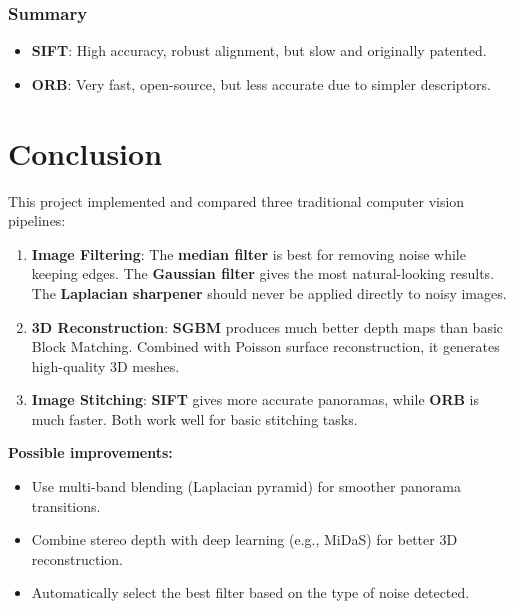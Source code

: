 \documentclass[a4paper,12pt]{article}
\begin{document}
\subsubsection*{Summary}

\begin{itemize}
    \item \textbf{SIFT}: High accuracy, robust alignment, but slow and originally patented.
    \item \textbf{ORB}: Very fast, open-source, but less accurate due to simpler descriptors.
\end{itemize}

\section{Conclusion}

This project implemented and compared three traditional computer vision pipelines:

\begin{enumerate}
    \item \textbf{Image Filtering}: The \textbf{median filter} is best for removing noise while keeping edges. The \textbf{Gaussian filter} gives the most natural-looking results. The \textbf{Laplacian sharpener} should never be applied directly to noisy images.

    \item \textbf{3D Reconstruction}: \textbf{SGBM} produces much better depth maps than basic Block Matching. Combined with Poisson surface reconstruction, it generates high-quality 3D meshes.

    \item \textbf{Image Stitching}: \textbf{SIFT} gives more accurate panoramas, while \textbf{ORB} is much faster. Both work well for basic stitching tasks.
\end{enumerate}

\textbf{Possible improvements:}
\begin{itemize}
    \item Use multi-band blending (Laplacian pyramid) for smoother panorama transitions.
    \item Combine stereo depth with deep learning (e.g., MiDaS) for better 3D reconstruction.
    \item Automatically select the best filter based on the type of noise detected.
\end{itemize}
\end{document}
